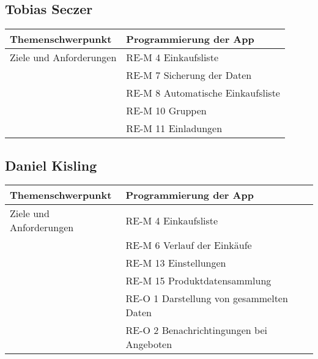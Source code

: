 \hypertarget{tobias-seczer}{%
\subsection{Tobias Seczer}\label{tobias-seczer}}

\begin{longtable}[]{@{}ll@{}}
\toprule
Themenschwerpunkt & Programmierung der App\tabularnewline
\midrule
\endhead
Ziele und Anforderungen & RE-M 4 Einkaufsliste\tabularnewline
& RE-M 7 Sicherung der Daten\tabularnewline
& RE-M 8 Automatische Einkaufsliste\tabularnewline
& RE-M 10 Gruppen\tabularnewline
& RE-M 11 Einladungen\tabularnewline
\bottomrule
\end{longtable}

\hypertarget{daniel-kisling}{%
\subsection{Daniel Kisling}\label{daniel-kisling}}

\begin{longtable}[]{@{}ll@{}}
\toprule
Themenschwerpunkt & Programmierung der App\tabularnewline
\midrule
\endhead
Ziele und Anforderungen & RE-M 4 Einkaufsliste\tabularnewline
& RE-M 6 Verlauf der Einkäufe\tabularnewline
& RE-M 13 Einstellungen\tabularnewline
& RE-M 15 Produktdatensammlung\tabularnewline
& RE-O 1 Darstellung von gesammelten Daten\tabularnewline
& RE-O 2 Benachrichtingungen bei Angeboten\tabularnewline
\bottomrule
\end{longtable}
